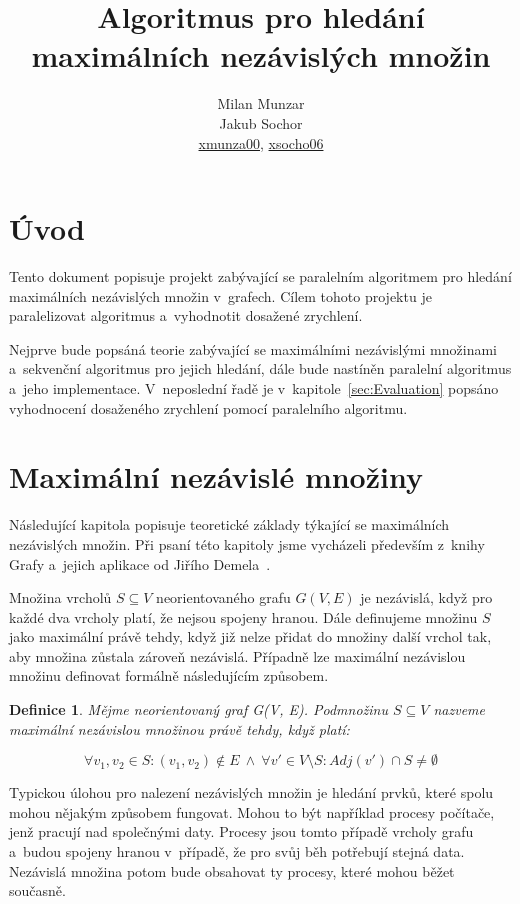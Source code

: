 \documentclass[12pt]{article}
\title{Algoritmus pro hledání maximálních nezávislých množin}
\author{Milan Munzar\\
Jakub Sochor\\
\normalsize{\url{xmunza00}, \url{xsocho06} }}
\date{}
\newtheorem{definition}{Definice}
\begin{document}
\maketitle

\section{Úvod}
Tento dokument popisuje projekt zabývající se paralelním algoritmem pro hledání maximálních nezávislých množin v~grafech. Cílem tohoto projektu je paralelizovat algoritmus a~vyhodnotit dosažené zrychlení.

Nejprve bude popsáná teorie zabývající se maximálními nezávislými množinami a~sekvenční algoritmus pro jejich hledání, dále bude nastíněn paralelní algoritmus a~jeho implementace. V~neposlední řadě je v~kapitole~\ref{sec:Evaluation} popsáno vyhodnocení dosaženého zrychlení pomocí paralelního algoritmu.



\section{Maximální nezávislé množiny}

Následující kapitola popisuje teoretické základy týkající se maximálních nezávislých množin. Při psaní této kapitoly jsme vycházeli především z~knihy Grafy a~jejich aplikace od Jiřího Demela~\cite{demel}.

Množina vrcholů $S \subseteq V$ neorientovaného grafu $G(V,E)$ je nezávislá, když pro každé dva vrcholy platí, že nejsou spojeny hranou. Dále definujeme množinu $S$ jako maximální právě tehdy, když již nelze přidat do množiny další vrchol tak, aby množina zůstala zároveň nezávislá. Případně lze maximální nezávislou množinu definovat formálně následujícím způsobem.

\begin{definition}
Mějme neorientovaný graf G(V, E). Podmnožinu $S \subseteq V$ nazveme maximální nezávislou množinou právě tehdy, když platí:

\begin{equation*}
\forall v_1, v_2 \in S: (v_1, v_2) \notin E\ \wedge\ \forall v' \in V \setminus S: Adj(v') \cap S \neq \emptyset
\end{equation*}



\end{definition}


Typickou úlohou pro nalezení nezávislých množin je hledání prvků, které spolu mohou nějakým způsobem fungovat. Mohou to být například procesy počítače, jenž pracují nad společnými daty. Procesy jsou tomto případě vrcholy grafu a~budou spojeny hranou v~případě, že pro svůj běh potřebují stejná data. Nezávislá množina potom bude obsahovat ty procesy, které mohou běžet současně.
\end{document}
